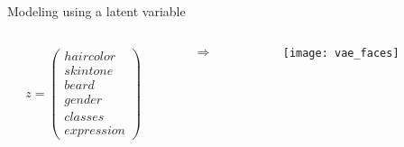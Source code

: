 \begin{frame}{Modeling using a latent variable}

  \begin{columns}
    \hspace{2cm}
    \begin{column}{0.3\textwidth}
      \begin{align*}
        z = \begin{pmatrix}
          haircolor \\
          skin tone \\
          beard \\
          gender \\
          classes \\
          expression
        \end{pmatrix}
      \end{align*}
    \end{column}
    \begin{column}{0.1\textwidth}
      \begin{align*}
        \Rightarrow
      \end{align*}
    \end{column}
    \begin{column}{0.4\textwidth}
      \begin{figure}
        \texttt{[image: vae\_faces]}
      \end{figure}
    \end{column}
    \hspace{2cm}
  \end{columns}


\end{frame}


